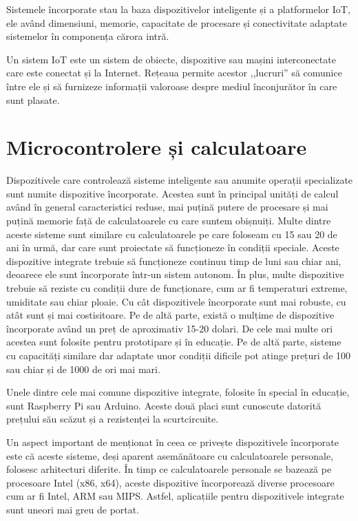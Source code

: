 Sistemele încorporate stau la baza dispozitivelor inteligente și a platformelor
IoT, ele având dimensiuni, memorie, capacitate de procesare și conectivitate
adaptate sistemelor în componența cărora intră.

Un sistem IoT este un sistem de obiecte, dispozitive sau mașini interconectate
care este conectat și la Internet. Rețeaua permite acestor ,,lucruri'' să comunice
între ele și să furnizeze informații valoroase despre mediul înconjurător în
care sunt plasate.

\section{Microcontrolere și calculatoare}
\label{sec:embed:micro-comp}

Dispozitivele care controlează sisteme
inteligente sau anumite operații specializate sunt numite dispozitive
încorporate. Acestea sunt în principal unități de calcul având în general
caracteristici reduse, mai puțină putere de procesare și mai puțină memorie față
de calculatoarele cu care suntem obișnuiți. Multe dintre aceste sisteme sunt
similare cu calculatoarele pe care foloseam cu 15 sau 20 de ani în urmă, dar
care sunt proiectate să funcționeze în condiții speciale. Aceste dispozitive
integrate trebuie să funcționeze continuu timp de luni sau chiar ani, deoarece
ele sunt încorporate într-un sistem autonom. În plus, multe dispozitive trebuie
să reziste cu condiții dure de funcționare, cum ar fi temperaturi extreme,
umiditate sau chiar ploaie. Cu cât dispozitivele încorporate sunt mai robuste, cu
atât sunt și mai costisitoare. Pe de altă parte, există o mulțime de dispozitive
încorporate având un preț de aproximativ 15-20 dolari. De cele mai multe ori
acestea sunt folosite pentru prototipare și în educație. Pe de altă parte,
sisteme cu capacități similare dar adaptate unor condiții dificile pot atinge
prețuri de 100 sau chiar și de 1000 de ori mai mari.

Unele dintre cele mai comune dispozitive integrate, folosite în special în
educație, sunt Raspberry Pi sau Arduino. Aceste două placi sunt cunoscute
datorită prețului său scăzut și a rezistenței la scurtcircuite.

Un aspect important de menționat în ceea ce privește dispozitivele încorporate
este că aceste sisteme, deși aparent asemănătoare cu calculatoarele personale,
folosesc arhitecturi diferite. În timp ce calculatoarele personale se bazează pe
procesoare Intel (x86, x64), aceste dispozitive încorporează diverse procesoare
cum ar fi Intel, ARM sau MIPS. Astfel, aplicațiile pentru dispozitivele
integrate sunt uneori mai greu de portat.

